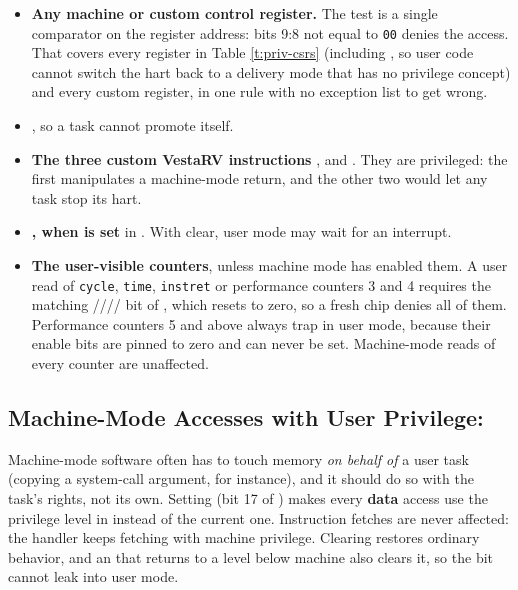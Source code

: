 \begin{itemize}
	\item \textbf{Any machine or custom control register.} The test is a single comparator on the register address: bits 9:8 not equal to \texttt{00} denies the access. That covers every register in Table \ref{t:priv-csrs} (including , so user code cannot switch the hart back to a delivery mode that has no privilege concept) and every custom register, in one rule with no exception list to get wrong.
	\item \textbf{}, so a task cannot promote itself.
	\item \textbf{The three custom VestaRV instructions} ,  and . They are privileged: the first manipulates a machine-mode return, and the other two would let any task stop its hart.
	\item \textbf{, when  is set} in . With  clear, user mode may wait for an interrupt.
	\item \textbf{The user-visible counters}, unless machine mode has enabled them. A user read of \texttt{cycle}, \texttt{time}, \texttt{instret} or performance counters 3 and 4 requires the matching //// bit of , which resets to zero, so a fresh chip denies all of them. Performance counters 5 and above always trap in user mode, because their enable bits are pinned to zero and can never be set. Machine-mode reads of every counter are unaffected.
\end{itemize}

\subsection{Machine-Mode Accesses with User Privilege: }

Machine-mode software often has to touch memory \textit{on behalf of} a user task (copying a system-call argument, for instance), and it should do so with the task's rights, not its own. Setting  (bit 17 of ) makes every \textbf{data} access use the privilege level in  instead of the current one. Instruction fetches are never affected: the handler keeps fetching with machine privilege. Clearing  restores ordinary behavior, and an  that returns to a level below machine also clears it, so the bit cannot leak into user mode.

